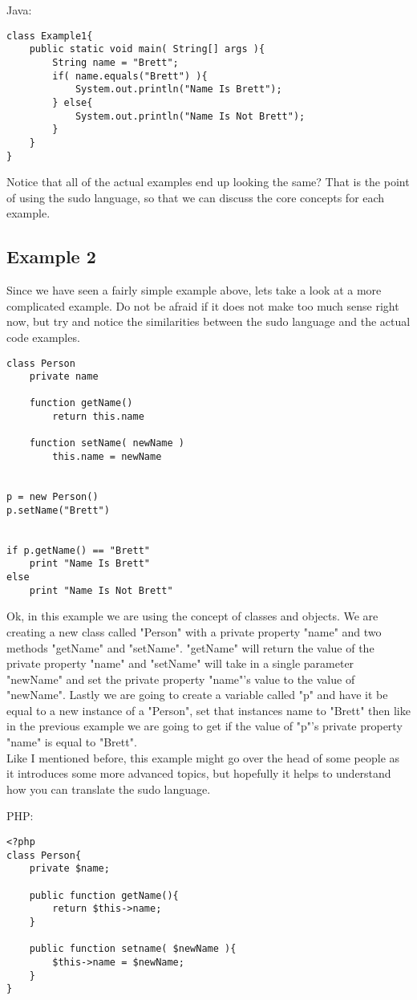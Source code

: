 Java:
\begin{lstlisting}
class Example1{
    public static void main( String[] args ){
        String name = "Brett";
        if( name.equals("Brett") ){
            System.out.println("Name Is Brett");
        } else{
            System.out.println("Name Is Not Brett");
        }
    }
}
\end{lstlisting}

Notice that all of the actual examples end up looking the same? That is the point of using the sudo language, so that we can
discuss the core concepts for each example.

\subsection{Example 2}
Since we have seen a fairly simple example above, lets take a look at a more complicated example. Do not be afraid if it does not make
too much sense right now, but try and notice the similarities between the sudo language and the actual code examples.

\begin{lstlisting}
class Person
    private name
    
    function getName()
        return this.name
    
    function setName( newName )
        this.name = newName


p = new Person()
p.setName("Brett")


if p.getName() == "Brett"
    print "Name Is Brett"
else
    print "Name Is Not Brett"
\end{lstlisting}

Ok, in this example we are using the concept of classes and objects. We are creating a new class called "Person" with a
private property "name" and two methods "getName" and "setName". "getName" will return the value of the private property "name" and
"setName" will take in a single parameter "newName" and set the private property "name"'s value to the value of "newName". Lastly we
are going to create a variable called "p" and have it be equal to a new instance of a "Person", set that instances name to "Brett" then like 
in the previous example we are going to get if the value of "p"'s private property "name" is equal to "Brett".
\newline
\\
Like I mentioned before, this example might go over the head of some people as it introduces some more advanced topics, but hopefully it
helps to understand how you can translate the sudo language.

PHP:
\begin{lstlisting}
<?php
class Person{
    private $name;
    
    public function getName(){
        return $this->name;
    }
    
    public function setname( $newName ){
        $this->name = $newName;
    }
}
\end{lstlisting}
